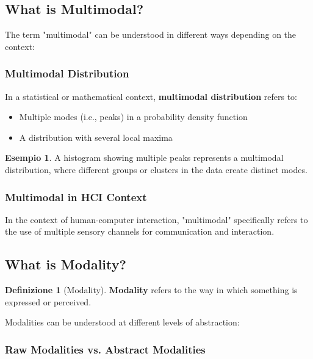 \documentclass[11pt,a4paper]{article}
\theoremstyle{definition}
\newtheorem{definition}{Definizione}[section]
\newtheorem{example}{Esempio}[section]
\theoremstyle{plain}
\theoremstyle{remark}
\begin{document}
\subsection{What is Multimodal?}

The term "multimodal" can be understood in different ways depending on the context:

\subsubsection{Multimodal Distribution}

In a statistical or mathematical context, \textbf{multimodal distribution} refers to:
\begin{itemize}
    \item Multiple modes (i.e., peaks) in a probability density function
    \item A distribution with several local maxima
\end{itemize}

\begin{example}
A histogram showing multiple peaks represents a multimodal distribution, where different groups or clusters in the data create distinct modes.
\end{example}

\subsubsection{Multimodal in HCI Context}

In the context of human-computer interaction, "multimodal" specifically refers to the use of multiple sensory channels for communication and interaction.

\subsection{What is Modality?}

\begin{definition}[Modality]
\textbf{Modality} refers to the way in which something is expressed or perceived.
\end{definition}

Modalities can be understood at different levels of abstraction:

\subsubsection{Raw Modalities vs. Abstract Modalities}
\end{document}
